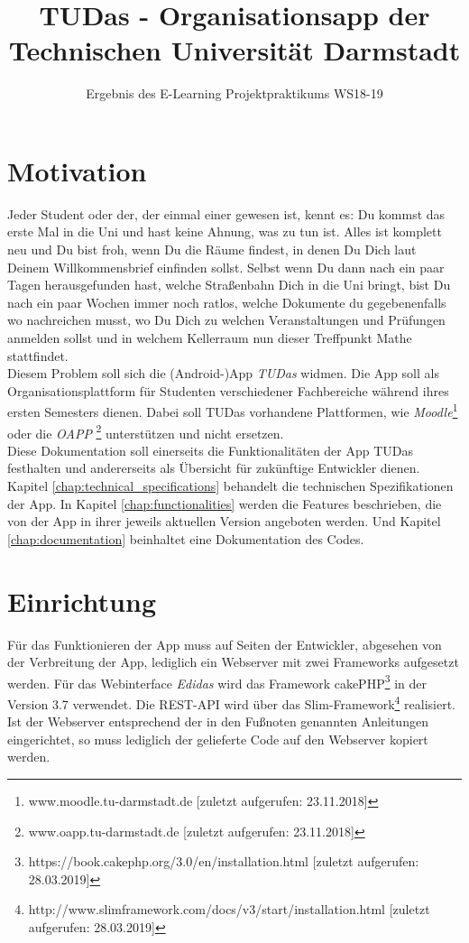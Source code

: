 \documentclass[noindent]{tudreport}
\title{TUDas - Organisationsapp der Technischen Universität Darmstadt}
\subtitle{Ergebnis des E-Learning Projektpraktikums WS18-19}
\begin{document}
	\lstset{language=Java}
	\maketitle
	\tableofcontents
	
	\chapter{Motivation}
		Jeder Student oder der, der einmal einer gewesen ist, kennt es: Du kommst das erste Mal in die Uni und hast keine Ahnung, was zu tun ist. Alles ist komplett neu und Du bist froh, wenn Du die Räume findest, in denen Du Dich laut Deinem Willkommensbrief einfinden sollst. Selbst wenn Du dann nach ein paar Tagen herausgefunden hast, welche Straßenbahn Dich in die Uni bringt, bist Du nach ein paar Wochen immer noch ratlos, welche Dokumente du gegebenenfalls wo nachreichen musst, wo Du Dich zu welchen Veranstaltungen und Prüfungen anmelden sollst und in welchem Kellerraum nun dieser Treffpunkt Mathe stattfindet.\\
		
		Diesem Problem soll sich die (Android-)App \textit{TUDas} widmen. Die App soll als Organisationsplattform für Studenten verschiedener Fachbereiche während ihres ersten Semesters dienen. Dabei soll TUDas vorhandene Plattformen, wie \textit{Moodle}\footnote{www.moodle.tu-darmstadt.de [zuletzt aufgerufen: 23.11.2018]} oder die \textit{OAPP} \footnote{www.oapp.tu-darmstadt.de [zuletzt aufgerufen: 23.11.2018]} unterstützen und nicht ersetzen.\\
		
		Diese Dokumentation soll einerseits die Funktionalitäten der App TUDas festhalten und andererseits als Übersicht für zukünftige Entwickler dienen. Kapitel \ref{chap:technical_specifications} behandelt die technischen Spezifikationen der App. In Kapitel \ref{chap:functionalities} werden die Features beschrieben, die von der App in ihrer jeweils aktuellen Version angeboten werden. Und Kapitel \ref{chap:documentation} beinhaltet eine Dokumentation des Codes.
		
	\chapter{Einrichtung}\label{chap:setup}
		Für das Funktionieren der App muss auf Seiten der Entwickler, abgesehen von der Verbreitung der App, lediglich ein Webserver mit zwei Frameworks aufgesetzt werden. Für das Webinterface \textit{Edidas} wird das Framework cakePHP\footnote{https://book.cakephp.org/3.0/en/installation.html [zuletzt aufgerufen: 28.03.2019]} in der Version 3.7 verwendet. Die REST-API wird über das Slim-Framework\footnote{http://www.slimframework.com/docs/v3/start/installation.html [zuletzt aufgerufen: 28.03.2019]} realisiert. Ist der Webserver entsprechend der in den Fußnoten genannten Anleitungen eingerichtet, so muss lediglich der gelieferte Code auf den Webserver kopiert werden.
	
\end{document}
